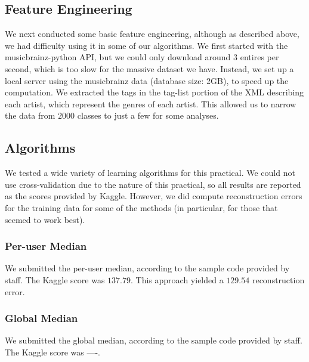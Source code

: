 \documentclass[10pt]{article}
\begin{document}
\subsection{Feature Engineering}
We next conducted some basic feature engineering, although as described above, we had difficulty using it in some of our algorithms. We first started with the musicbrainz-python API, but we could only download around $3$ entires per second, which is too slow for the massive dataset we have. Instead, we set up a local server using the musicbrainz data (database size: 2GB), to speed up the computation. We extracted the tags in the tag-list portion of the XML describing each artist, which represent the genres of each artist. This allowed us to narrow the data from $2000$ classes to just a few for some analyses.

\subsection{Algorithms}
We tested a wide variety of learning algorithms for this practical. We could not use cross-validation due to the nature of this practical, so all results are reported as the scores provided by Kaggle. However, we did compute reconstruction errors for the training data for some of the methods (in particular, for those that seemed to work best).

\subsubsection{Per-user Median}
We submitted the per-user median, according to the sample code provided by staff. The Kaggle score was $137.79$. This approach yielded a $129.54$ reconstruction error.

\subsubsection{Global Median}
We submitted the global median, according to the sample code provided by staff. The Kaggle score was ----.
\end{document}
